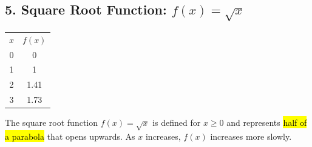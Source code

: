 \documentclass[12pt,a4paper]{article}
\begin{document}
\subsection*{5. Square Root Function: $f(x) = \sqrt{x}$}
\begin{minipage}{0.5\textwidth}
\end{minipage}
\hspace{1cm}
\begin{minipage}{0.4\textwidth}
\centering
\begin{tabular}{cc}
\toprule
$x$ & $f(x)$ \\

0 & 0 \\
1 & 1 \\
2 & 1.41 \\
3 & 1.73 \\

\end{tabular}
\end{minipage}
\noindent
The square root function $f(x) = \sqrt{x}$ is defined for $x \geq 0$ and represents \hl{half of a parabola} that opens upwards. As $x$ increases, $f(x)$ increases more slowly.
\end{document}
